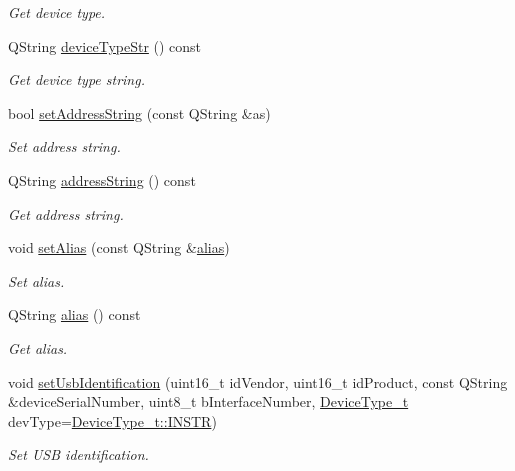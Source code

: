 \begin{DoxyCompactItemize}
\begin{DoxyCompactList}\small\item\em Get device type. \end{DoxyCompactList}\item 
Q\-String \hyperlink{classmdt_device_address_a16df2a5fdb967035d11a1950f8e900f4}{device\-Type\-Str} () const 
\begin{DoxyCompactList}\small\item\em Get device type string. \end{DoxyCompactList}\item 
bool \hyperlink{classmdt_device_address_a0cc71ea63086e80217536e4d13430f45}{set\-Address\-String} (const Q\-String \&as)
\begin{DoxyCompactList}\small\item\em Set address string. \end{DoxyCompactList}\item 
Q\-String \hyperlink{classmdt_device_address_a4c932b32f4b8222fe4ec89f6685dc2f1}{address\-String} () const 
\begin{DoxyCompactList}\small\item\em Get address string. \end{DoxyCompactList}\item 
void \hyperlink{classmdt_device_address_a8e17010c5cd0611d427e6c8d24f26831}{set\-Alias} (const Q\-String \&\hyperlink{classmdt_device_address_aa08397e5d6f507b6eeddaafb89c84cc3}{alias})
\begin{DoxyCompactList}\small\item\em Set alias. \end{DoxyCompactList}\item 
Q\-String \hyperlink{classmdt_device_address_aa08397e5d6f507b6eeddaafb89c84cc3}{alias} () const 
\begin{DoxyCompactList}\small\item\em Get alias. \end{DoxyCompactList}\item 
void \hyperlink{classmdt_device_address_afe2562a54cadea4f79ecf6e4d44ed2ce}{set\-Usb\-Identification} (uint16\-\_\-t id\-Vendor, uint16\-\_\-t id\-Product, const Q\-String \&device\-Serial\-Number, uint8\-\_\-t b\-Interface\-Number, \hyperlink{classmdt_device_address_a8e776267826886cd846fb2d75b9b7b2b}{Device\-Type\-\_\-t} dev\-Type=\hyperlink{classmdt_device_address_a8e776267826886cd846fb2d75b9b7b2bac48b30e1372f2477bb18dc29450acdf4}{Device\-Type\-\_\-t\-::\-I\-N\-S\-T\-R})
\begin{DoxyCompactList}\small\item\em Set U\-S\-B identification. \end{DoxyCompactList}\item 

\end{DoxyCompactItemize}

